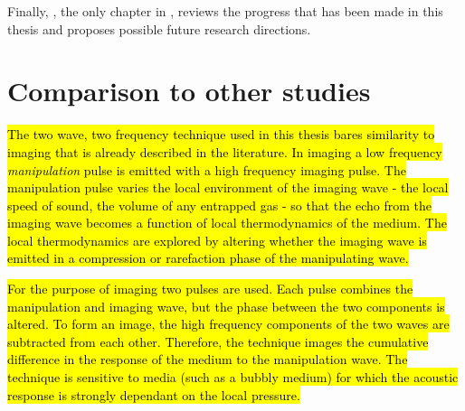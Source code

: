 

Finally, , the only chapter in ,
reviews the progress that has been made in this thesis
and proposes possible future research directions.



\section{Comparison to other studies}

\hl{The two wave, two frequency technique used in this thesis bares similarity to {} imaging that is already described in the literature{\cite{Hanson2009}}.
  In  {} imaging a low frequency \emph{manipulation} pulse is emitted with a high frequency imaging pulse.
  The manipulation pulse varies the local environment of the imaging wave - the local speed of sound, the volume of any entrapped gas -
  so that the echo from the imaging wave becomes a function of local thermodynamics of the medium.
  The local thermodynamics are explored by altering whether the imaging wave is emitted in a compression or rarefaction phase of the manipulating wave.}

\hl{For the purpose of imaging two pulses are used.
  Each pulse combines the manipulation and imaging wave, but the phase between the two components is altered.
  To form an image, the high frequency components of the two waves are subtracted from each other.
  Therefore, the {} technique images the cumulative difference in the response of the medium to the manipulation wave.
  The technique is  sensitive to media (such as a bubbly medium) for which the acoustic response is strongly dependant on the local pressure.}
  
